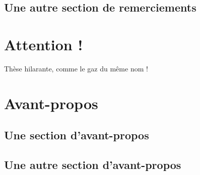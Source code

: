 \documentclass[12pt,space=onehalf]{yathesis}
\begin{document}
\section{Une autre section de remerciements}
\lipsum[2-9]
%
\chapter{Attention !}
Thèse hilarante, comme le gaz du même nom !
%
\begin{abstract}
  \lipsum[1-2]
\end{abstract}
\begin{abstract}
  \lipsum[3-4]
\end{abstract}
\makeabstract
%
\printacronyms
%
\printsymbols
%
\chapter{Avant-propos}
\section{Une section d'avant-propos}
\lipsum[30-45]
\section{Une autre section d'avant-propos}
\lipsum[30-35]
%
\tableofcontents[depth=chapter,name=Sommaire]
%
\listoftables
%
\listoffigures
%
%
\mainmatter
%

%
%
\end{document}
